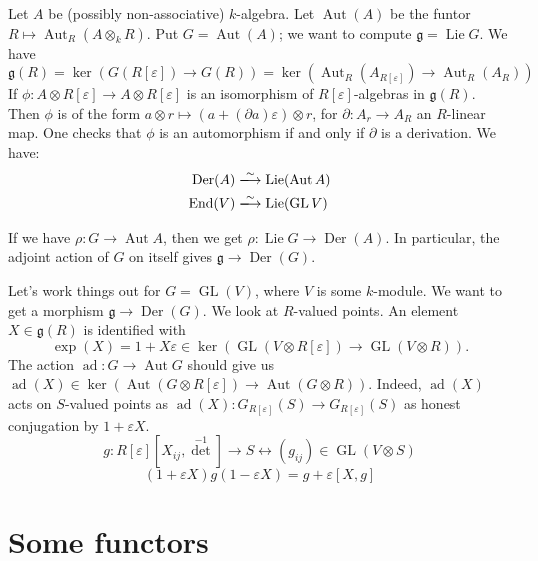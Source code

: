 \documentclass{article}
\DeclareMathOperator{\adjoint}{ad}
\DeclareMathOperator{\automorphism}{Aut}
\DeclareMathOperator{\derivation}{Der}
\DeclareMathOperator{\End}{End}
\DeclareMathOperator{\generallinear}{GL}
\DeclareMathOperator{\lie}{Lie}
\newcommand{\fg}{\mathfrak{g}}
\newcommand{\iso}{\xlongrightarrow\sim}
\begin{document}
Let $A$ be (possibly non-associative) $k$-algebra. Let 
$\automorphism(A)$ be the funtor 
$R\mapsto \automorphism_R(A\otimes_k R)$. Put $G=\automorphism(A)$; we want to 
compute $\fg=\lie G$. We have 
\[
  \fg(R) = \ker(G(R[\varepsilon]) \to G(R)) = \ker(\automorphism_R(A_{R[\varepsilon]}) \to \automorphism_R(A_R)) 
\]
If $\phi:A\otimes R[\varepsilon] \to A\otimes R[\varepsilon]$ is an isomorphism 
of $R[\varepsilon]$-algebras in $\fg(R)$. Then $\phi$ is of the form 
$a\otimes r\mapsto (a+(\partial a)\varepsilon)\otimes r$, for 
$\partial:A_r\to A_R$ an $R$-linear map. One checks that $\phi$ is an automorphism 
if and only if $\partial$ is a derivation. We have: 
\begin{align*}
  \derivation(A) &\iso \lie(\automorphism A) \\
  \End(V) &\iso \lie(\generallinear V) 
\end{align*}

If we have $\rho:G\to \automorphism A$, then we get 
$\rho:\lie G\to \derivation(A)$. In particular, the adjoint action of $G$ on 
itself gives $\fg \to \derivation(G)$. 

Let's work things out for $G=\generallinear(V)$, where $V$ is some 
$k$-module. We want to get a morphism $\fg \to \derivation(G)$. We look at 
$R$-valued points. An element $X\in \fg(R)$ is identified with 
\[
  \exp(X) = 1+X\varepsilon\in \ker(\generallinear(V\otimes R[\varepsilon]) \to \generallinear(V\otimes R)) .
\]
The action $\adjoint:G\to \automorphism G$ should give us 
$\adjoint(X)\in \ker(\automorphism(G\otimes R[\varepsilon]) \to \automorphism(G\otimes R))$. Indeed, $\adjoint(X)$ acts on $S$-valued points as 
$\adjoint(X):G_{R[\varepsilon]}(S)\to G_{R[\varepsilon]}(S)$ as honest 
conjugation by $1+\varepsilon X$.
\[
  g:R[\varepsilon][X_{i j},{\det}^{-1}] \to S \leftrightarrow (g_{i j})\in \generallinear(V\otimes S)
\]
\[
  (1+\varepsilon X) g (1-\varepsilon X) = g+\varepsilon[X,g]	
\]





\section{Some functors}
\end{document}
